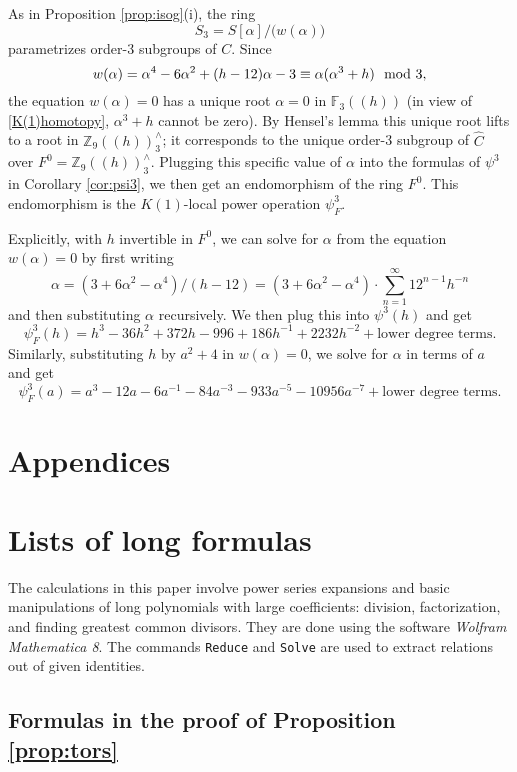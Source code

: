 \documentclass{gtpart}
\theoremstyle{definition}
\theoremstyle{remark}
\newcommand{\mb}[1]{\mathbb{#1}}
\newcommand{\BF}{{\mb F}}
\newcommand{\BZ}{{\mb Z}}
\newcommand{\HC}{\widehat{C}}
\newcommand{\md}{~~{\rm mod}~}
\newcommand{\A}{\alpha}
\newcommand{\p}{\psi^3}
\begin{document}
As in Proposition \ref{prop:isog}\thinspace (i), the ring 
\[
 S_3 = S[\A] \big/ \big( w(\A) \big) 
\]
parametrizes order-3 subgroups of $C$.  Since 
\[
 w(\A) = \A^4 - 6 \A^2 + (h - 12) \A - 3 \equiv \A (\A^3 + h) \md 3, 
\]
the equation $w(\A) = 0$ has a unique root $\A = 0$ in $\BF_3 (\!(h)\!)$ (in view of \eqref{K(1)homotopy}, $\A^3 + h$ cannot be zero).  
By Hensel's lemma this unique root lifts to a root in $\BZ_9 (\!(h)\!)_3^\wedge$; 
it corresponds to the unique order-3 subgroup of $\HC$ over $F^0 = \BZ_9 (\!(h)\!)_3^\wedge$.  
Plugging this specific value of $\A$ into the formulas of $\p$ in Corollary \ref{cor:psi3}, we then get an endomorphism of the ring $F^0$.  
This endomorphism is the $K(1)$-local power operation $\psi_F^3$.  

Explicitly, with $h$ invertible in $F^0$, we can solve for $\A$ from the equation $w(\A) = 0$ by first writing 
\[
 \A = (3 + 6 \A^2 - \A^4) / (h - 12) = (3 + 6 \A^2 - \A^4) \cdot \sum_{n = 1}^\infty 12^{n-1} h^{-n} 
\]
and then substituting $\A$ recursively.  We then plug this into $\p(h)$ and get 
\[
 \psi_F^3(h) = h^3 - 36 h^2 + 372 h - 996 + 186 h^{-1} + 2232 h^{-2} + \text{lower degree terms}.  
\]
Similarly, substituting $h$ by $a^2 + 4$ in $w(\A) = 0$, we solve for $\A$ in terms of $a$ and get 
\[
 \psi_F^3(a) = a^3 - 12 a - 6 a^{-1} - 84 a^{-3} - 933 a^{-5} - 10956 a^{-7} + \text{lower degree terms}.  
\]


\appendix
\section*{Appendices}

\section{Lists of long formulas}
\label{apx:long}

The calculations in this paper involve power series expansions and basic manipulations of long polynomials with large coefficients: 
division, factorization, and finding greatest common divisors.  
They are done using the software {\em Wolfram Mathematica 8}.  
The commands \texttt{Reduce} and \texttt{Solve} are used to extract relations out of given identities.


\subsection{Formulas in the proof of Proposition \ref{prop:tors}}
\label{apx:tors}
\end{document}
